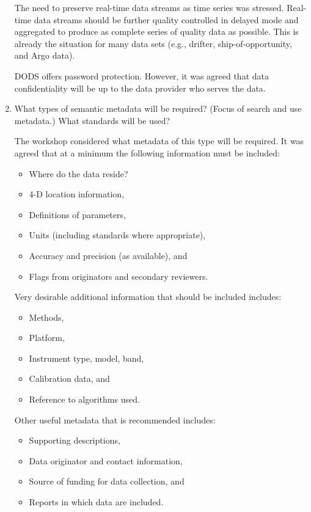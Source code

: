 \begin{enumerate}
The need to preserve real-time data streams as time series was stressed. Real-time data streams 
should be further quality controlled in delayed mode and aggregated to produce as complete 
series of quality data as possible. This is already the situation for many data sets (e.g., drifter, 
ship-of-opportunity, and Argo data).

DODS offers password protection. However, it was agreed that data confidentiality will be up to 
the data provider who serves the data. 

\item What types of semantic metadata will be required? (Focus of search and use metadata.) What 
standards will be used?

The workshop considered what metadata of this type will be required. It was agreed that at a 
minimum the following information must be included:
\begin{itemize}
\item Where do the data reside?
\item 4-D location information,
\item Definitions of parameters,
\item Units (including standards where appropriate),
\item Accuracy and precision (as available), and
\item Flags from originators and secondary reviewers.
\end{itemize}

Very desirable additional information that should be included includes:
\begin{itemize}
\item Methods,
\item Platform,
\item Instrument type, model, band,
\item Calibration data, and
\item Reference to algorithms used.
\end{itemize}

Other useful metadata that is recommended includes:
\begin{itemize}
\item Supporting descriptions,
\item Data originator and contact information,
\item Source of funding for data collection, and
\item Reports in which data are included.
\end{itemize}


\end{enumerate}
